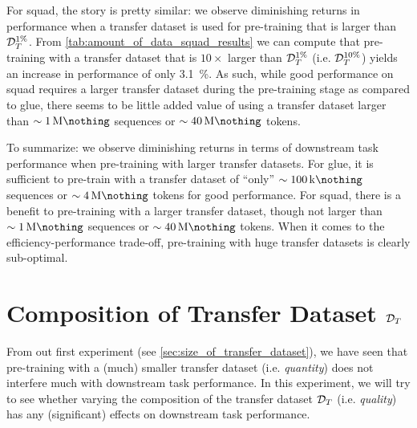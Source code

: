 For \gls{squad}, the story is pretty similar: we observe diminishing returns in performance when a transfer dataset is used for pre-training that is larger than $\mathcal{D}_T^{1\%}$. From \cref{tab:amount_of_data_squad_results} we can compute that pre-training with a transfer dataset that is $10 \times$ larger than $\mathcal{D}_T^{1\%}$ (i.e. $\mathcal{D}_T^{10\%}$) yields an increase in performance of only \SI{3.1}{\percent}. As such, while good performance on \gls{squad} requires a larger transfer dataset during the pre-training stage as compared to \gls{glue}, there seems to be little added value of using a transfer dataset larger than $\sim \SI{1}{\mega\nothing}$ sequences or $\sim \SI{40}{\mega\nothing}$ tokens.

To summarize: we observe diminishing returns in terms of downstream task performance when pre-training with larger transfer datasets. For \gls{glue}, it is sufficient to pre-train with a transfer dataset of ``only'' $\sim \SI{100}{\kilo\nothing}$ sequences or $\sim \SI{4}{\mega\nothing}$ tokens for good performance. For \gls{squad}, there is a benefit to pre-training with a larger transfer dataset, though not larger than $\sim \SI{1}{\mega\nothing}$ sequences or $\sim \SI{40}{\mega\nothing}$ tokens. When it comes to the efficiency-performance trade-off, pre-training with huge transfer datasets is clearly sub-optimal.









\section{Composition of Transfer Dataset $\mathcal{D}_T$}
\label{sec:composition_of_transfer_dataset}
From out first experiment (see \cref{sec:size_of_transfer_dataset}), we have seen that pre-training with a (much) smaller transfer dataset (i.e. \emph{quantity}) does not interfere much with downstream task performance. In this experiment, we will try to see whether varying the composition of the transfer dataset $\mathcal{D}_T$ (i.e. \emph{quality}) has any (significant) effects on downstream task performance.



